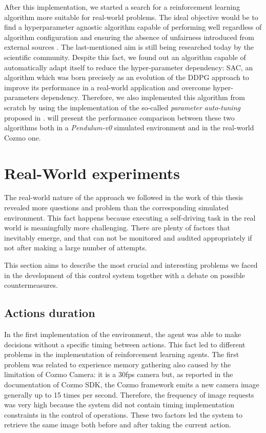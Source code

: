 After this implementation, we started a search for a reinforcement learning algorithm more suitable for real-world problems.
The ideal objective would be to find a hyperparameter agnostic algorithm capable of performing well regardless of algorithm configuration and ensuring the absence of unfairness introduced from external sources \cite{henderson2018deep}.
The last-mentioned aim is still being researched today by the scientific community.
Despite this fact, we found out an algorithm capable of automatically adapt itself to reduce the hyper-parameter dependency: SAC, an algorithm which was born precisely as an evolution of the DDPG approach to improve its performance in a real-world application and overcome hyper-parameters dependency.
Therefore, we also implemented this algorithm from scratch by using the implementation of the so-called \textit{parameter auto-tuning} proposed in \cite{haarnoja2018soft, haarnoja2018alg}.
 will present the performance comparison between these two algorithms both in a \textit{Pendulum-v0} simulated environment and in the real-world Cozmo one.

\section{Real-World experiments}

The real-world nature of the approach we followed in the work of this thesis revealed more questions and problem than the corresponding simulated environment. This fact happens because executing a self-driving task in the real world is meaningfully more challenging. There are plenty of factors that inevitably emerge, and that can not be monitored and audited appropriately if not after making a large number of attempts.

This section aims to describe the most crucial and interesting problems we faced in the development of this control system together with a debate on possible countermeasures.

\subsection{Actions duration} \label{subsec:actions-duration}

In the first implementation of the environment, the agent was able to make decisions without a specific timing between actions.
This fact led to different problems in the implementation of reinforcement learning agents.
The first problem was related to experience memory gathering also caused by the limitation of Cozmo Camera: it is a 30fps camera but, as reported in the documentation of Cozmo SDK, the Cozmo framework emits a new camera image generally up to 15 times per second.
Therefore, the frequency of image requests was very high because the system did not contain timing implementation constraints in the control of operations.
These two factors led the system to retrieve the same image both before and after taking the current action.

